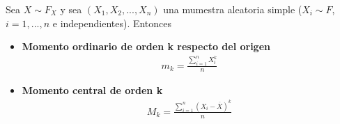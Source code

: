 Sea $X \sim F_X$ y sea $(X_1, X_2,..., X_n)$ una mumestra aleatoria simple ($X_i \sim F$, $i = 1,...,n$ e independientes). Entonces
\begin{itemize}
    \item \textbf{Momento ordinario de orden k respecto del origen}
          \begin{align*}
              m_k = \frac{\sum_{i=1}^{n}{X_i^k}}{n}
          \end{align*}
    \item \textbf{Momento central de orden k}
          \begin{align*}
              M_k = \frac{\sum_{i=1}^{n}{(X_i - \overline{X})^k}}{n}
          \end{align*}
\end{itemize}

